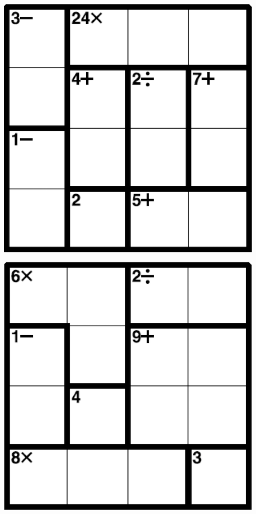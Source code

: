 
\includegraphics[scale=1]{Gambar/Lampiran/4x4_25.png}

\includegraphics[scale=1]{Gambar/Lampiran/4x4_26.png}

